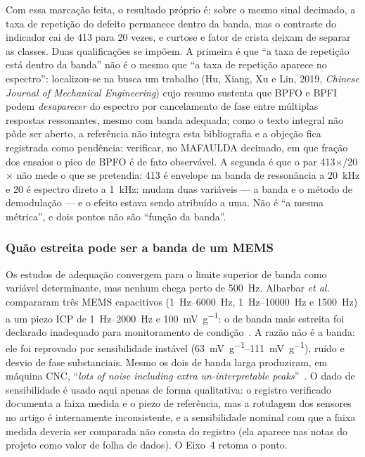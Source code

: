 \documentclass[11pt,a4paper]{article}
\begin{document}
Com essa marcação feita, o resultado próprio é: sobre o mesmo sinal decimado, a taxa de
repetição do defeito permanece dentro da banda, mas o contraste do indicador cai de
\num{413} para \num{20} vezes, e curtose e fator de crista deixam de separar as classes.
Duas qualificações se impõem. A primeira é que ``a taxa de repetição está dentro da
banda'' não é o mesmo que ``a taxa de repetição aparece no espectro'': localizou-se na
busca um trabalho (Hu, Xiang, Xu e Lin, 2019, \emph{Chinese Journal of Mechanical
Engineering}) cujo resumo sustenta que BPFO e BPFI podem \emph{desaparecer} do espectro
por cancelamento de fase entre múltiplas respostas ressonantes, mesmo com banda adequada;
como o texto integral não pôde ser aberto, a referência não integra esta bibliografia e a
objeção fica registrada como pendência: verificar, no MAFAULDA decimado, em que fração dos
ensaios o pico de BPFO é de fato observável. A segunda é que o par
\num{413}$\times$/\num{20}$\times$ não mede o que se pretendia: \num{413} é envelope na
banda de ressonância a \SI{20}{\kilo\hertz} e \num{20} é espectro direto a
\SI{1}{\kilo\hertz}: mudam duas variáveis --- a banda e o método de demodulação --- e o
efeito estava sendo atribuído a uma. Não é ``a mesma métrica'', e dois pontos não são
``função da banda''.

\subsubsection{Quão estreita pode ser a banda de um MEMS}

Os estudos de adequação convergem para o limite superior de banda como variável determinante,
mas nenhum chega perto de \SI{500}{\hertz}. Albarbar \emph{et al.} compararam três MEMS
capacitivos (\SIrange{1}{6000}{\hertz}, \SIrange{1}{10000}{\hertz} e \SI{1500}{\hertz}) a
um piezo ICP de \SIrange{1}{2000}{\hertz} e \SI{100}{\milli\volt\per\gram}: o de banda
mais estreita foi declarado inadequado para monitoramento de condição~\cite{albarbar2008}.
A razão não é a banda: ele foi reprovado por sensibilidade instável
(\SIrange{63}{111}{\milli\volt\per\gram}), ruído e desvio de fase substanciais. Mesmo os
dois de banda larga produziram, em máquina CNC, ``\textit{lots of noise including extra
un-interpretable peaks}''~\cite{albarbar2008}. O dado de sensibilidade é usado aqui apenas
de forma qualitativa: o registro verificado documenta a faixa medida e o piezo de
referência, mas a rotulagem dos sensores no artigo é internamente inconsistente, e a
sensibilidade nominal com que a faixa medida deveria ser comparada não consta do registro
(ela aparece nas notas do projeto como valor de folha de dados). O Eixo~4 retoma o ponto.
\end{document}
